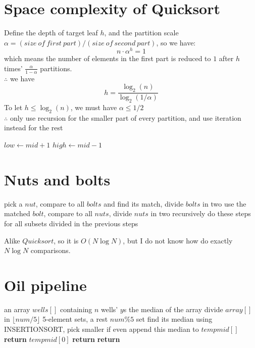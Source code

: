 \documentclass[a4paper]{article}
\begin{document}
\begin{spacing}{1.3}
\section*{Space complexity of Quicksort}
Define the depth of target leaf $h$, and the partition scale $\alpha=(size\ of\ first\ part)/(size\ of\ second\ part)$, so we have:
$$n\cdot \alpha^{h}=1$$ which means the number of elements in the first part is reduced to $1$ after $h$ times' $\frac{\alpha}{1-\alpha}$ partitions.
\\$\therefore$ we have $$h=\frac{\log_2(n)}{\log_2(1/\alpha)}$$
To let $h\leq \log_2(n)$, we must have $\alpha \leq 1/2$
\\$\therefore$ only use recursion for the smaller part of every partition, and use iteration instead for the rest
\begin{algorithmic}[1]
 
\State {}
\State {}
\State $low\gets mid+1$
\Else
\State {}
\State $high\gets mid-1$
\EndIf
\EndWhile
\EndFunction
\end{algorithmic}

\section*{Nuts and bolts}
\begin{algorithmic}[1]
\State pick a $nut$, compare to all $bolts$ and find its match, divide $bolts$ in two
\State use the matched $bolt$, compare to all $nuts$, divide $nuts$ in two
\State recursively do these steps for all subsets divided in the previous steps
\end{algorithmic}
Alike $Quicksort$, so it is $O(N\log N)$, but I do not know how do exactly $N\log N$ comparisons.

\section*{Oil pipeline}
\begin{algorithmic}[1]
\Require an array $wells[]$ containing $n$ wells' $y$s 
\Ensure the median of the array
\State divide $array[]$ in $\lfloor num/5 \rfloor$ 5-element sets, a rest $num\%5$ set
\State find its median using INSERTIONSORT, pick smaller if even
\State append this median to $tempmid[]$
\EndFor
{}
\State \textbf{return} $tempmid[0]$
\Else 
\State \textbf{return}  
\EndIf 
\EndFunction
\State \textbf{return}  
\end{algorithmic}
\end{spacing}
\end{document}
